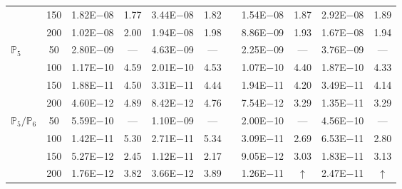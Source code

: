 \begin{table}[H]
{\begin{tabular}{@{}l c c c c c c c c c c@{}}
 & 150 & 1.82E$-$08 & 1.77  & 3.44E$-$08 & 1.82 &  & 1.54E$-$08 & 1.87 & 2.92E$-$08 & 1.89\\
 & 200 & 1.02E$-$08 & 2.00  & 1.94E$-$08 & 1.98 &  & 8.86E$-$09 & 1.93 & 1.67E$-$08 & 1.94\\
\midrule
\multirow{4}{*}{$\mathbb{P}_{5}$}
 & 50 & 2.80E$-$09 & ---  & 4.63E$-$09 & --- &  & 2.25E$-$09 & --- & 3.76E$-$09 & ---\\
 & 100 & 1.17E$-$10 & 4.59  & 2.01E$-$10 & 4.53 &  & 1.07E$-$10 & 4.40 & 1.87E$-$10 & 4.33\\
 & 150 & 1.88E$-$11 & 4.50  & 3.31E$-$11 & 4.44 &  & 1.94E$-$11 & 4.20 & 3.49E$-$11 & 4.14\\
 & 200 & 4.60E$-$12 & 4.89  & 8.42E$-$12 & 4.76 &  & 7.54E$-$12 & 3.29 & 1.35E$-$11 & 3.29\\
\midrule
\multirow{4}{*}{$\mathbb{P}_{5}/\mathbb{P}_{6}$}
 & 50 & 5.59E$-$10 & ---  & 1.10E$-$09 & --- &  & 2.00E$-$10 & --- & 4.56E$-$10 & ---\\
 & 100 & 1.42E$-$11 & 5.30  & 2.71E$-$11 & 5.34 &  & 3.09E$-$11 & 2.69 & 6.53E$-$11 & 2.80\\
 & 150 & 5.27E$-$12 & 2.45  & 1.12E$-$11 & 2.17 &  & 9.05E$-$12 & 3.03 & 1.83E$-$11 & 3.13\\
 & 200 & 1.76E$-$12 & 3.82  & 3.66E$-$12 & 3.89 &  & 1.26E$-$11 & $\uparrow$ & 2.47E$-$11 & $\uparrow$\\
\bottomrule
\end{tabular}}
\label{none}
\end{table}
